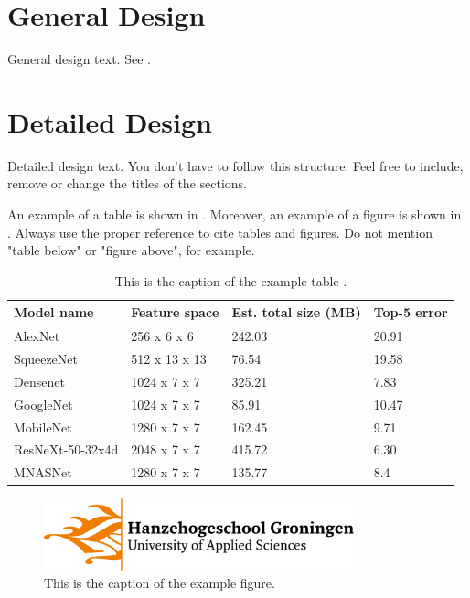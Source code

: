 \section{General Design}

General design text. See .  %

\section{Detailed Design}

Detailed design text. You don't have to follow this structure. Feel free to include, remove or change the titles of the sections.

An example of a table is shown in . Moreover, an example of a figure is shown in . Always use the proper reference to cite tables and figures. Do not mention "table below" or "figure above", for example.

\begin{table}
    \centering
        \begin{tabular}{ p{35mm}  P{3cm}   P{40mm}  P{3cm}}
            \hline
            Model name & Feature space & Est. total size (MB) & Top-5 error \\
            \hline
            AlexNet          &   256  x 6 x  6     &  242.03  &    20.91 \\
            SqueezeNet       &   512  x 13 x 13   &   76.54   &    19.58 \\
            Densenet         &   1024 x 7 x  7    &   325.21  &    7.83  \\
            GoogleNet        &   1024 x 7 x  7    &   85.91   &    10.47 \\
            MobileNet        &   1280 x 7 x  7    &   162.45  &    9.71  \\
            ResNeXt-50-32x4d &   2048 x 7 x  7    &   415.72  &    6.30  \\
            MNASNet          &   1280 x 7 x  7    &   135.77  &    8.4  \\
            \hline
        \end{tabular}
    \caption{This is the caption of the example table \cite{torchvisionmodels}.}
    \label{tab:models}
\end{table}


\begin{figure}[b]  %
    \centering
    \includegraphics[width=0.8\textwidth]{images/hanzelogo_nl.png}
    \caption{This is the caption of the example figure.}
    \label{fig:example_figure}
\end{figure}
